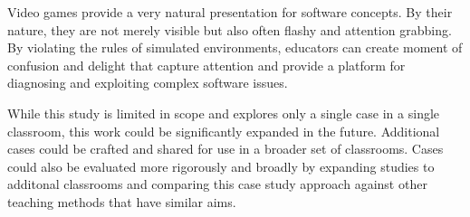 \documentclass[letterpaper]{article}
\begin{document}
Video games provide a very natural presentation for software concepts. By their nature, they are not merely visible but also often flashy and attention grabbing. By violating the rules of simulated environments, educators can create moment of confusion and delight that capture attention and provide a platform for diagnosing and exploiting complex software issues.

While this study is limited in scope and explores only a single case in a single classroom, this work could be significantly expanded in the future. Additional cases could be crafted and shared for use in a broader set of classrooms. Cases could also be evaluated more rigorously and broadly by expanding studies to additonal classrooms and comparing this case study approach against other teaching methods that have similar aims.

%
%

\printbibliography
\end{document}
